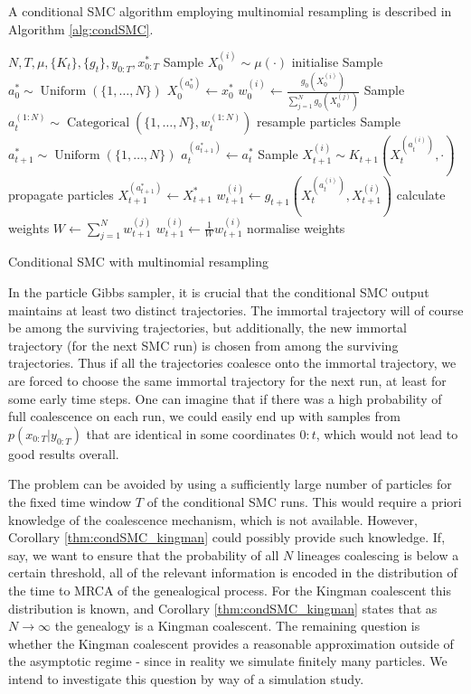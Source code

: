 \documentclass[fleqn]{article}
\theoremstyle{definition}
\newcommand{\Cat}{\operatorname{Categorical}}
\newcommand{\Unif}{\operatorname{Uniform}}
\begin{document}
A conditional SMC algorithm employing multinomial resampling is described in Algorithm \ref{alg:condSMC}.

\begin{algorithm}
\begin{algorithmic}[1]
\Require $N, T, \mu, \{K_t\}, \{g_t\}, y_{0:T}, x_{0:T}^*$
	\State Sample $X_0^{(i)} \sim \mu(\cdot)$ \Comment initialise
\EndFor
\State Sample $a_0^* \sim \Unif(\{1,\dots,N\})$
\State $X_0^{(a_0^*)} \gets x_0^*$
	\State $w_0^{(i)} \gets \frac{g_0(X_0^{(i)})}{\sum_{j=1}^N g_0(X_0^{(j)})}$
\EndFor
{}
	\State Sample $a_t^{(1:N)} \sim \Cat(\{1,\dots,N\}, w_t^{(1:N)})$ \Comment resample particles
	\State Sample $a_{t+1}^* \sim \Unif(\{1,\dots,N\})$
	\State $a_t^{(a_{t+1}^*)} \gets a_t^*$
		\State Sample $X_{t+1}^{(i)} \sim K_{t+1}(X_t^{(a_t^{(i)})}, \cdot)$ \Comment propagate particles
	\EndFor
	\State $X_{t+1}^{(a_{t+1}^*)} \gets X_{t+1}^*$
		\State $w_{t+1}^{(i)} \gets g_{t+1}(X_t^{(a_t^{(i)})} , X_{t+1}^{(i)})$ \Comment calculate weights
	\EndFor
	\State $W \gets \sum_{j=1}^N w_{t+1}^{(j)}$
		\State $w_{t+1}^{(i)} \gets \frac{1}{W}w_{t+1}^{(i)}$ \Comment normalise weights
	\EndFor
\EndFor
\end{algorithmic}
\caption{Conditional SMC with multinomial resampling}
\label{alg:condSMC}
\end{algorithm}

In the particle Gibbs sampler, it is crucial that the conditional SMC output maintains at least two distinct trajectories. 
The immortal trajectory will of course be among the surviving trajectories, but additionally, the new immortal trajectory (for the next SMC run) is chosen from among the surviving trajectories.
Thus if all the trajectories coalesce onto the immortal trajectory, we are forced to choose the same immortal trajectory for the next run, at least for some early time steps.
One can imagine that if there was a high probability of full coalescence on each run, we could easily end up with samples from $p(x_{0:T}|y_{0:T})$ that are identical in some coordinates $0:t$, which would not lead to good results overall.

The problem can be avoided by using a sufficiently large number of particles for the fixed time window $T$ of the conditional SMC runs. This would require a priori knowledge of the coalescence mechanism, which is not available. However, Corollary \ref{thm:condSMC_kingman} could possibly provide such knowledge.
If, say, we want to ensure that the probability of all $N$ lineages coalescing is below a certain threshold, all of the relevant information is encoded in the distribution of the time to MRCA of the genealogical process. For the Kingman coalescent this distribution is known, and Corollary \ref{thm:condSMC_kingman} states that as $N\to\infty$ the genealogy is a Kingman coalescent.
The remaining question is whether the Kingman coalescent provides a reasonable approximation outside of the asymptotic regime - since in reality we simulate finitely many particles. We intend to investigate this question by way of a simulation study.
\end{document}
